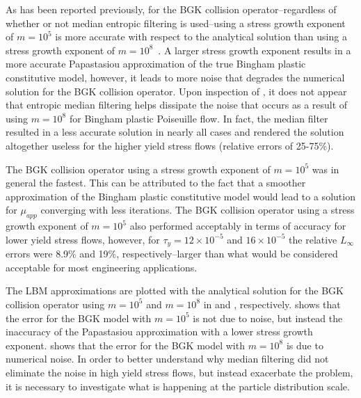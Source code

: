\documentclass{article}
\begin{document}
As has been reported previously, for the BGK collision operator--regardless of whether or not median entropic filtering is used--using a stress growth exponent of $m = 10^5$ is more accurate with respect to the analytical solution than using a stress growth exponent of $m = 10^8$~\cite{chen2014simulations}.
A larger stress growth exponent results in a more accurate Papastasiou approximation of the true Bingham plastic constitutive model, however, it leads to more noise that degrades the numerical solution for the BGK collision operator.
Upon inspection of , it does not appear that entropic median filtering helps dissipate the noise that occurs as a result of using $m = 10^8$ for Bingham plastic Poiseuille flow.
In fact, the median filter resulted in a less accurate solution in nearly all cases and rendered the solution altogether useless for the higher yield stress flows (relative errors of 25-75\%).

The BGK collision operator using a stress growth exponent of $m = 10^5$ was in general the fastest.
This can be attributed to the fact that a smoother approximation of the Bingham plastic constitutive model would lead to a solution for $\mu_{app}$ converging with less iterations.
The BGK collision operator using a stress growth exponent of $m = 10^5$ also performed acceptably in terms of accuracy for lower yield stress flows, however, for $\tau_y = 12 \times 10^{-5}$ and $16 \times 10^{-5}$ the relative $L_\infty$ errors were 8.9\% and 19\%, respectively--larger than what would be considered acceptable for most engineering applications.

The LBM approximations are plotted with the analytical solution for the BGK collision operator using $m = 10^5$ and $m = 10^8$ in  and , respectively.
 shows that the error for the BGK model with $m = 10^5$ is not due to noise, but instead the inaccuracy of the Papastasiou approximation with a lower stress growth exponent.
 shows that the error for the BGK model with $m = 10^8$ is due to numerical noise.
In order to better understand why median filtering did not eliminate the noise in high yield stress flows, but instead exacerbate the problem, it is necessary to investigate what is happening at the particle distribution scale.
\end{document}
